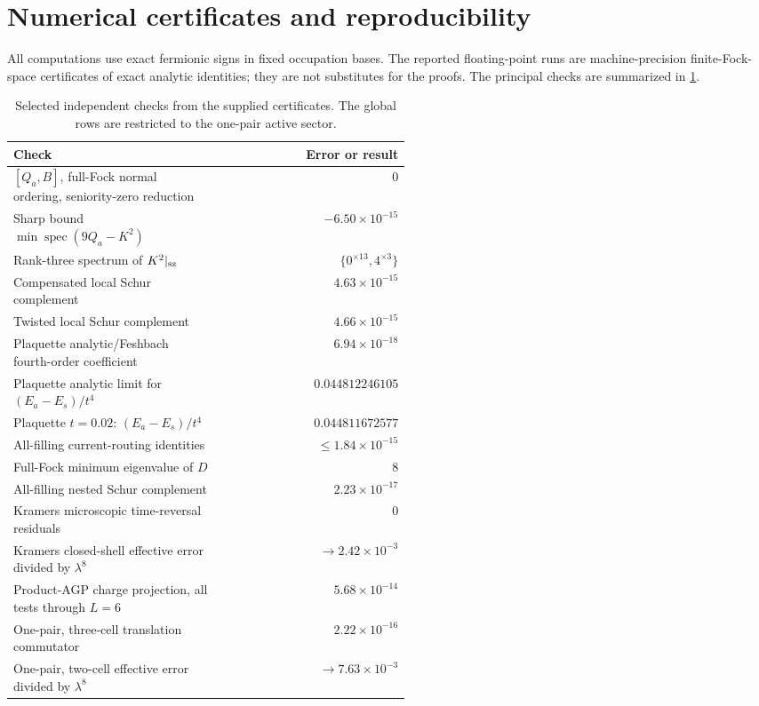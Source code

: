 \documentclass[11pt]{article}
\theoremstyle{definition}
\theoremstyle{remark}
\newcommand{\spec}{\operatorname{spec}}
\begin{document}
\section{Numerical certificates and reproducibility}
\label{sec:numerics}

All computations use exact fermionic signs in fixed occupation bases.  The reported floating-point runs are machine-precision finite-Fock-space certificates of exact analytic identities; they are not substitutes for the proofs.  The principal checks are summarized in \cref{tab:certificates}.

\begin{table}[H]
\centering
\caption{Selected independent checks from the supplied certificates.  The global rows are restricted to the one-pair active sector.}
\label{tab:certificates}
\begin{tabular}{@{}p{0.52\linewidth}r@{}}
\toprule
Check & Error or result\\
\midrule
$[Q_a,B]$, full-Fock normal ordering, seniority-zero reduction & $0$\\
Sharp bound $\min\spec(9Q_a-K^2)$ & $-6.50\times10^{-15}$\\
Rank-three spectrum of $K^2|_{\rm sz}$ & $\{0^{\times13},4^{\times3}\}$\\
Compensated local Schur complement & $4.63\times10^{-15}$\\
Twisted local Schur complement & $4.66\times10^{-15}$\\
Plaquette analytic/Feshbach fourth-order coefficient & $6.94\times10^{-18}$\\
Plaquette analytic limit for $(E_a-E_s)/t^4$ & $0.044812246105$\\
Plaquette $t=0.02$: $(E_a-E_s)/t^4$ & $0.044811672577$\\
All-filling current-routing identities & $\le1.84\times10^{-15}$\\
Full-Fock minimum eigenvalue of $D$ & $8$\\
All-filling nested Schur complement & $2.23\times10^{-17}$\\
Kramers microscopic time-reversal residuals & $0$\\
Kramers closed-shell effective error divided by $\lambda^8$ & $\to2.42\times10^{-3}$\\
Product-AGP charge projection, all tests through $L=6$ & $5.68\times10^{-14}$\\
One-pair, three-cell translation commutator & $2.22\times10^{-16}$\\
One-pair, two-cell effective error divided by $\lambda^8$ & $\to7.63\times10^{-3}$\\
\bottomrule
\end{tabular}
\end{table}
\end{document}
